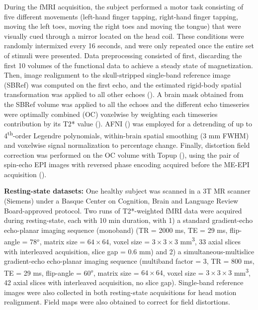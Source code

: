 During the fMRI acquisition, the subject performed a motor task consisting of five different movements (left-hand finger tapping, right-hand finger tapping, moving the left toes, moving the right toes and moving the tongue) that were visually cued through a mirror located on the head coil. These conditions were randomly intermixed every 16 seconds, and were only repeated once the entire set of stimuli were presented. Data preprocessing consisted of first, discarding the first 10 volumes of the functional data to achieve a steady state of magnetization. Then, image realignment to the skull-stripped single-band reference image (SBRef) was computed on the first echo, and the estimated rigid-body spatial transformation was applied to all other echoes (\citealt{Jenkinson2012FSL,Jenkinson_2001}). A brain mask obtained from the SBRef volume was applied to all the echoes and the different echo timeseries were optimally combined (OC) voxelwise by weighting each timeseries contribution by its T2* value (\citealt{Posse_1999}). AFNI (\citealt{Cox1996AFNISoftwareAnalysis}) was employed for a detrending of up to 4\textsuperscript{th}-order Legendre polynomials, within-brain spatial smoothing (3 mm FWHM) and voxelwise signal normalization to percentage change. Finally, distortion field correction was performed on the OC volume with Topup (\citealt{Andersson_2003}), using the pair of spin-echo EPI images with reversed phase encoding acquired before the ME-EPI acquisition (\citealt{Glasser_2016}).

\textbf{Resting-state datasets:} One healthy subject was scanned in a 3T MR scanner (Siemens) under a Basque Center on Cognition, Brain and Language Review Board-approved protocol. Two runs of T2*-weighted fMRI data were acquired during resting-state, each with 10 min duration, with 1) a standard gradient-echo echo-planar imaging sequence (monoband) (TR = 2000 ms, TE = 29 ms, flip-angle = 78\(^o\), matrix size = $64\times64$, voxel size = $3\times3\times3$ mm\textsuperscript{3}, 33 axial slices with interleaved acquisition, slice gap = 0.6 mm) and 2) a  simultaneous-multislice gradient-echo echo-planar imaging sequence (multiband factor = 3, TR = 800 ms, TE = 29 ms, flip-angle = 60\(^o\), matrix size = $64\times64$, voxel size = $3\times3\times3$ mm\textsuperscript{3}, 42 axial slices with interleaved acquisition, no slice gap). Single-band reference images were also collected in both resting-state acquisitions for head motion realignment. Field maps were also obtained to correct for field distortions.

